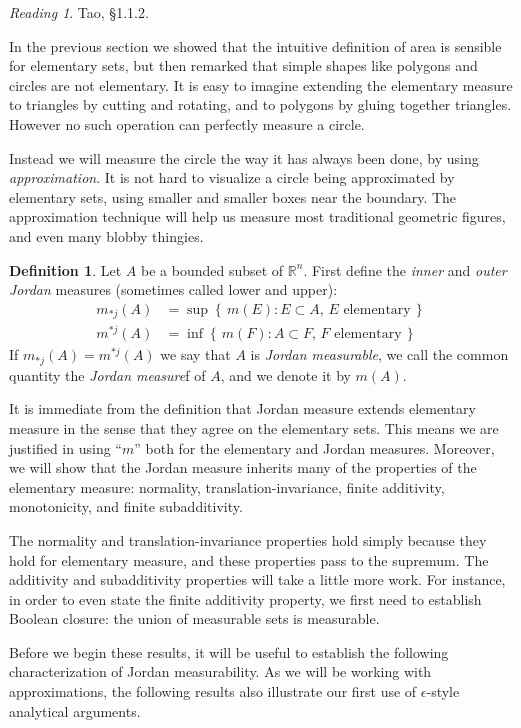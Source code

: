 \documentclass[11pt,oneside]{amsbook}
\newcommand{\set}[1]{\left\{\,#1\,\right\}}
\newcommand{\RR}{{\mathbb R}}
\theoremstyle{definition}
\theoremstyle{plain}
\theoremstyle{definition}
\newtheorem{defn}[thm]{Definition}
\theoremstyle{remark}
\newtheorem*{reading}{Reading}
\numberwithin{equation}{section}
\numberwithin{figure}{section}
\begin{document}
\begin{reading}
  Tao, \S1.1.2.
\end{reading}

In the previous section we showed that the intuitive definition of area is sensible for elementary sets, but then remarked that simple shapes like polygons and circles are not elementary. It is easy to imagine extending the elementary measure to triangles by cutting and rotating, and to polygons by gluing together triangles. However no such operation can perfectly measure a circle.

Instead we will measure the circle the way it has always been done, by using \emph{approximation}. It is not hard to visualize a circle being approximated by elementary sets, using smaller and smaller boxes near the boundary. The approximation technique will help us measure most traditional geometric figures, and even many blobby thingies.

\begin{defn}
  Let $A$ be a bounded subset of $\RR^n$. First define the \emph{inner} and \emph{outer Jordan} measures (sometimes called lower and upper):
  \begin{align*}
    m_{*j}(A)&=\sup\set{m(E):E\subset A,\, E\text{ elementary}}\\
    m^{*j}(A)&=\inf\set{m(F):A\subset F,\, F\text{ elementary}}
  \end{align*}
  If $m_{*j}(A)=m^{*j}(A)$ we say that $A$ is \emph{Jordan measurable}, we call the common quantity the \emph{Jordan measure}f of $A$, and we denote it by $m(A)$.
\end{defn}

It is immediate from the definition that Jordan measure extends elementary measure in the sense that they agree on the elementary sets. This means we are justified in using ``$m$'' both for the elementary and Jordan measures. Moreover, we will show that the Jordan measure inherits many of the properties of the elementary measure: normality, translation-invariance, finite additivity, monotonicity, and finite subadditivity.

The normality and translation-invariance properties hold simply because they hold for elementary measure, and these properties pass to the supremum. The additivity and subadditivity properties will take a little more work. For instance, in order to even state the finite additivity property, we first need to establish Boolean closure: the union of measurable sets is measurable.

Before we begin these results, it will be useful to establish the following characterization of Jordan measurability. As we will be working with approximations, the following results also illustrate our first use of $\epsilon$-style analytical arguments.
\end{document}
